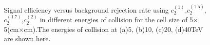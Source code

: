 \documentclass[final,1p,11pt]{elsarticle}
\begin{document}
\begin{figure}
\begin{center}

\end{center}
\caption{Signal efficiency versus background rejection rate using $c_2^{(1)}$,$c_2^{(1.5)}$,$c_2^{(1.7)}$,$c_2^{(2)}$ in different energies of collision for the cell size of  5$\times$5(cm$\times$cm).The energies of collision at (a)5, (b)10, (c)20, (d)40TeV are shown here.}
\label{cluster_r009_c_variable}
\end{figure}
\end{document}
